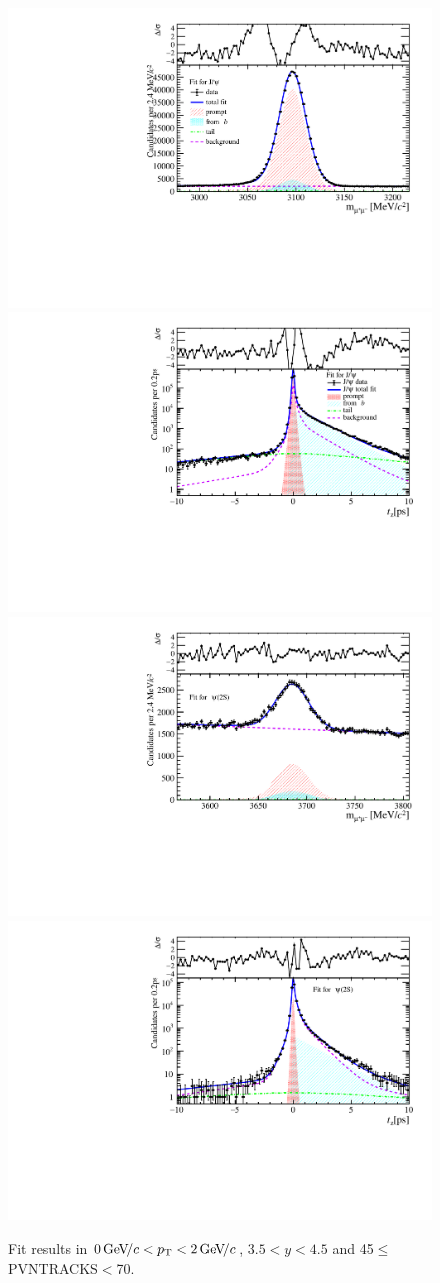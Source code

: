 \begin{figure}[H]
\begin{center}
\includegraphics[width=0.47\linewidth]{pdf/Jpsi/drawmass/n3y3pt1.pdf}
\includegraphics[width=0.47\linewidth]{pdf/Jpsi/2DFit/n3y3pt1.pdf}
\vspace*{-0.5cm}
\includegraphics[width=0.47\linewidth]{pdf/Psi2S/drawmass/n3y3pt1.pdf}
\includegraphics[width=0.47\linewidth]{pdf/Psi2S/2DFit/n3y3pt1.pdf}
\vspace*{-0.5cm}
\end{center}
\caption{Fit results in $0\text{\,Ge\kern -0.1em V\!/}c<p_{\mathrm{T}}<2\text{\,Ge\kern -0.1em V\!/}c$, $3.5<y<4.5$ and 45$\leq$PVNTRACKS$<$70.}
\label{Fitn3y3pt1}
\end{figure}
